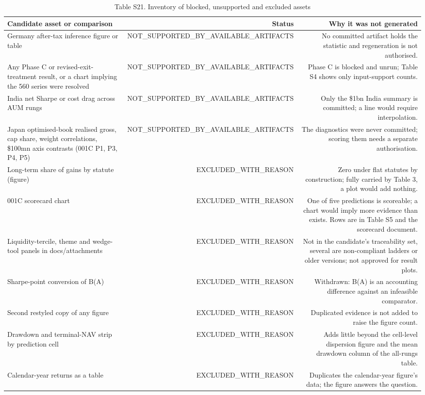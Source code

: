 \begin{table}[t]
\centering
\small
\caption{Table S21. Inventory of blocked, unsupported and excluded assets}
\label{tab:s21}
\begin{tabular}{lrr}
\toprule
Candidate asset or comparison & Status & Why it was not generated \\
\midrule
Germany after-tax inference figure or table & NOT\_SUPPORTED\_BY\_AVAILABLE\_ARTIFACTS & No committed artifact holds the statistic and regeneration is not authorised. \\
Any Phase C or revised-exit-treatment result, or a chart implying the 560 series were resolved & NOT\_SUPPORTED\_BY\_AVAILABLE\_ARTIFACTS & Phase C is blocked and unrun; Table S4 shows only input-support counts. \\
India net Sharpe or cost drag across AUM rungs & NOT\_SUPPORTED\_BY\_AVAILABLE\_ARTIFACTS & Only the \$1bn India summary is committed; a line would require interpolation. \\
Japan optimised-book realised gross, cap share, weight correlations, \$100mn axis contrasts (001C P1, P3, P4, P5) & NOT\_SUPPORTED\_BY\_AVAILABLE\_ARTIFACTS & The diagnostics were never committed; scoring them needs a separate authorisation. \\
Long-term share of gains by statute (figure) & EXCLUDED\_WITH\_REASON & Zero under flat statutes by construction; fully carried by Table 3, a plot would add nothing. \\
001C scorecard chart & EXCLUDED\_WITH\_REASON & One of five predictions is scoreable; a chart would imply more evidence than exists. Rows are in Table S5 and the scorecard document. \\
Liquidity-tercile, theme and wedge-tool panels in docs/attachments & EXCLUDED\_WITH\_REASON & Not in the candidate's traceability set, several are non-compliant ladders or older versions; not approved for result plots. \\
Sharpe-point conversion of B(A) & EXCLUDED\_WITH\_REASON & Withdrawn: B(A) is an accounting difference against an infeasible comparator. \\
Second restyled copy of any figure & EXCLUDED\_WITH\_REASON & Duplicated evidence is not added to raise the figure count. \\
Drawdown and terminal-NAV strip by prediction cell & EXCLUDED\_WITH\_REASON & Adds little beyond the cell-level dispersion figure and the mean drawdown column of the all-rungs table. \\
Calendar-year returns as a table & EXCLUDED\_WITH\_REASON & Duplicates the calendar-year figure's data; the figure answers the question. \\

\end{tabular}
\end{table}
